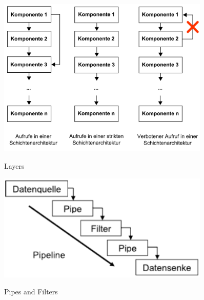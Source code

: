 \begin{figure}[htb]
    \centering
    \begin{minipage}[t]{0.45\linewidth}
		\centering
		\includegraphics[width=0.9\textwidth]{images/layers}
		\label{fig:layers}
		\caption{Layers}
    \end{minipage}%
    \hfill
    \begin{minipage}[t]{0.45\linewidth}
		\centering
		\includegraphics[width=0.9\textwidth]{images/pipes_filters}
		\label{fig:pipes_filters}
		\caption{Pipes and Filters}
    \end{minipage}
\end{figure}


